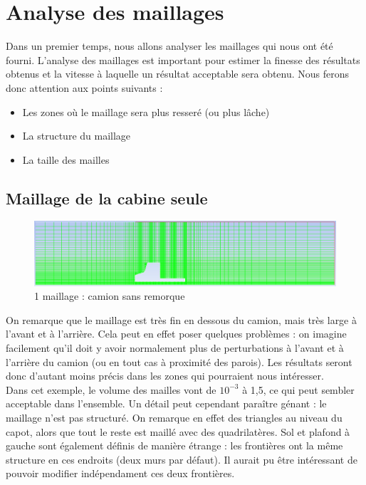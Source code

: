 \section{Analyse des maillages}
Dans un premier temps, nous allons analyser les maillages qui nous ont été fourni. L'analyse des maillages est important pour estimer la finesse des résultats obtenus et la vitesse à laquelle un résultat acceptable sera obtenu. Nous ferons donc attention aux points suivants :
\begin{itemize}
	\item Les zones où le maillage sera plus resseré (ou plus lâche)
	\item La structure du maillage
	\item La taille des mailles
\end{itemize}

\subsection{Maillage de la cabine seule}
\begin{figure}[!h]
\centering
\includegraphics[scale=0.4]{images/camion_cabine_1.png}
\caption{1\ier{} maillage : camion sans remorque}
\end{figure}
On remarque que le maillage est très fin en dessous du camion, mais très large à l'avant et à l'arrière. Cela peut en effet poser quelques problèmes : on imagine facilement qu'il doit y avoir normalement plus de perturbations à l'avant et à l'arrière du camion (ou en tout cas à proximité des parois). Les résultats seront donc d'autant moins précis dans les zones qui pourraient nous intéresser.\\
Dans cet exemple, le volume des mailles vont de $10^{-3}$ à 1,5, ce qui peut sembler acceptable dans l'ensemble. Un détail peut cependant paraître génant : le maillage n'est pas structuré. On remarque en effet des triangles au niveau du capot, alors que tout le reste est maillé avec des quadrilatères. Sol et plafond à gauche sont également définis de manière étrange : les frontières ont la même structure en ces endroits (deux murs par défaut). Il aurait pu être intéressant de pouvoir modifier indépendament ces deux frontières.

